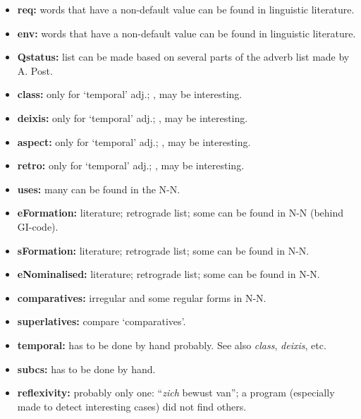 \begin{itemize}
\item {\bf req:} words that have a non-default value can be found in 
        linguistic literature.
 
\item {\bf env:} words that have a non-default value can be found in 
        linguistic literature.
 
\item {\bf Qstatus:} list can be made based on several parts of the adverb list
        made by A. Post.
 
\item {\bf class:} only for `temporal' adj.; \cite{po:tp},
        \cite{ko:ta} may be interesting.
 
\item {\bf deixis:} only for `temporal' adj.; \cite{po:tp},
        \cite{ko:ta}
        may be interesting.
 
\item {\bf aspect:} only for `temporal' adj.; \cite{po:tp},
        \cite{ko:ta}
        may be interesting.
 
\item {\bf retro:} only for `temporal' adj.; \cite{po:tp},
        \cite{ko:ta}
        may be interesting.
 
\item {\bf uses:} many can be found in the N-N.
 
\item {\bf eFormation:} literature; retrograde list; some can be found in N-N
      (behind GI-code).
 
\item {\bf sFormation:} literature; retrograde list; some can be found in N-N.
 
\item {\bf eNominalised:} literature; retrograde list; some can be found in N-N.
 
\item {\bf comparatives:} irregular and some regular forms in N-N.
 
\item {\bf superlatives:} compare `comparatives'.
 
\item {\bf temporal:} has to be done by hand probably. See also {\em class}, 
      {\em deixis}, etc. 
 
\item {\bf subcs:} has to be done by hand.
 
\item {\bf reflexivity:} probably only one: ``{\em zich} bewust van''; 
      a program (especially made to detect interesting cases) did not find 
      others. 
 

\end{itemize}
